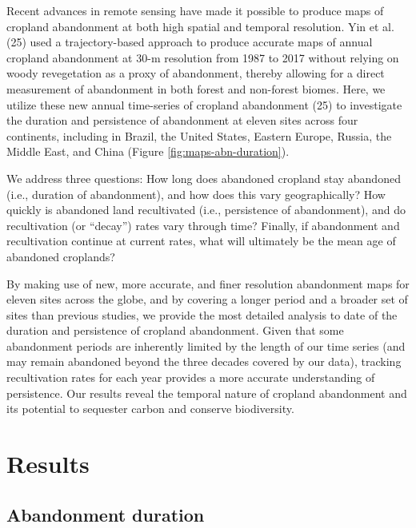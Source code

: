 \documentclass[9pt,twocolumn,twoside,lineno]{pnas-new}
\begin{document}
Recent advances in remote sensing have made it possible to produce maps of cropland abandonment at both high spatial and temporal resolution.
Yin et al. (25) used a trajectory-based approach to produce accurate maps of annual cropland abandonment at 30-m resolution from 1987 to 2017 without relying on woody revegetation as a proxy of abandonment, thereby allowing for a direct measurement of abandonment in both forest and non-forest biomes.
Here, we utilize these new annual time-series of cropland abandonment (25) to investigate the duration and persistence of abandonment at eleven sites across four continents, including in Brazil, the United States, Eastern Europe, Russia, the Middle East, and China (Figure \ref{fig:maps-abn-duration}).

We address three questions: How long does abandoned cropland stay abandoned (i.e., duration of abandonment), and how does this vary geographically?
How quickly is abandoned land recultivated (i.e., persistence of abandonment), and do recultivation (or ``decay'') rates vary through time?
Finally, if abandonment and recultivation continue at current rates, what will ultimately be the mean age of abandoned croplands?

By making use of new, more accurate, and finer resolution abandonment maps for eleven sites across the globe, and by covering a longer period and a broader set of sites than previous studies, we provide the most detailed analysis to date of the duration and persistence of cropland abandonment.
Given that some abandonment periods are inherently limited by the length of our time series (and may remain abandoned beyond the three decades covered by our data), tracking recultivation rates for each year provides a more accurate understanding of persistence.
Our results reveal the temporal nature of cropland abandonment and its potential to sequester carbon and conserve biodiversity.

\hypertarget{results}{%
\section*{Results}\label{results}}

\hypertarget{abandonment-duration}{%
\subsection*{Abandonment duration}\label{abandonment-duration}}
\end{document}
